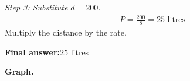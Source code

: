 \documentclass[11pt]{article}
\begin{document}
\textit{Step 3: Substitute \( d = 200 \).}
\[\begin{gathered}
P = \frac{200}{8} = 25 \text{ litres}
\end{gathered}\]
Multiply the distance by the rate.

\begin{answerbox}
\textbf{Final answer:}\quad \(\displaystyle  25 \) litres
\end{answerbox}
\textbf{Graph.}

\begin{center}
\end{center}
\end{document}

